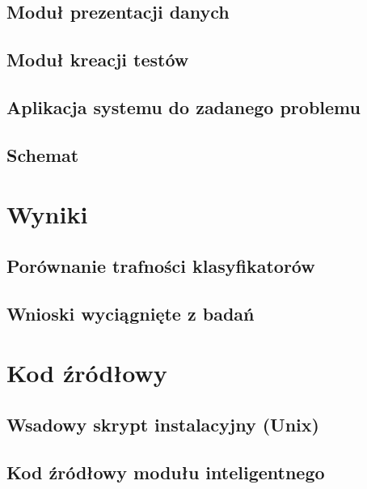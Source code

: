 \documentclass[12pt,a4paper,oneside]{report} %
\begin{document}
\section{Moduł prezentacji danych}
\section{Moduł kreacji testów}
\section{Aplikacja systemu do zadanego problemu}
\section{Schemat}
\chapter{Wyniki}
\section{Porównanie trafności klasyfikatorów}
\section{Wnioski wyciągnięte z badań}
\chapter{Kod źródłowy}
\section{Wsadowy skrypt instalacyjny (Unix)}
\section{Kod źródłowy modułu inteligentnego}

\end{document}
